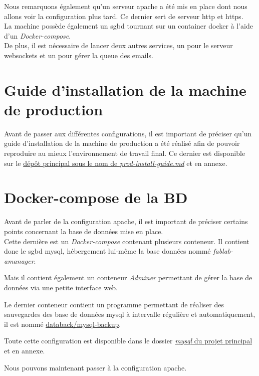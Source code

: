 \documentclass[
    iai, %
    il, %
]{heig-tb}
\begin{document}
Nous remarquons également qu'un serveur \Gls{apache} a été mis en place dont nous allons voir la configuration plus tard. Ce dernier sert de serveur \Gls{http} et \Gls{https}. \\
La machine possède également un \Gls{sgbd} tournant sur un container \Gls{docker} à l'aide d'un \emph{Docker-compose}. \\
De plus, il est nécessaire de lancer deux autres services, un pour le serveur \Gls{websockets} et un pour gérer la queue des emails.

\section{Guide d'installation de la machine de production}
Avant de passer aux différentes configurations, il est important de préciser qu'un guide d'installation de la machine de production a été réalisé afin de pouvoir reproduire au mieux l'environnement de travail final. Ce dernier est disponible sur le
\href{https://github.com/heig-fablab/fablab-manager/blob/main/prod-install-guide.md}{dépôt principal sous le nom de \emph{prod-install-guide.md}} et en annexe.

\section{Docker-compose de la BD}
Avant de parler de la configuration \Gls{apache}, il est important de préciser certains points concernant la base de données mise en place. \\
Cette dernière est un \emph{Docker-compose} contenant plusieurs \Gls{conteneur}. Il contient donc le \Gls{sgbd} \Gls{mysql}, hébergement lui-même la base données nommé \emph{fablab-amanager}.

Mais il contient également un \Gls{conteneur} \href{https://www.adminer.org/}{\emph{Adminer}} permettant de gérer la base de données via une petite interface web.

Le dernier \Gls{conteneur} contient un programme permettant de réaliser des sauvegardes des base de données \Gls{mysql} à intervalle régulière et automatiquement, il est nommé \href{https://hub.docker.com/r/databack/mysql-backup}{databack/mysql-backup}.

Toute cette configuration est disponible dans le dossier \href{https://github.com/heig-fablab/fablab-manager/blob/main/mysql/docker-compose.yml}{\emph{mysql} du projet principal} et en annexe.

Nous pouvons maintenant passer à la configuration \Gls{apache}.
\end{document}
